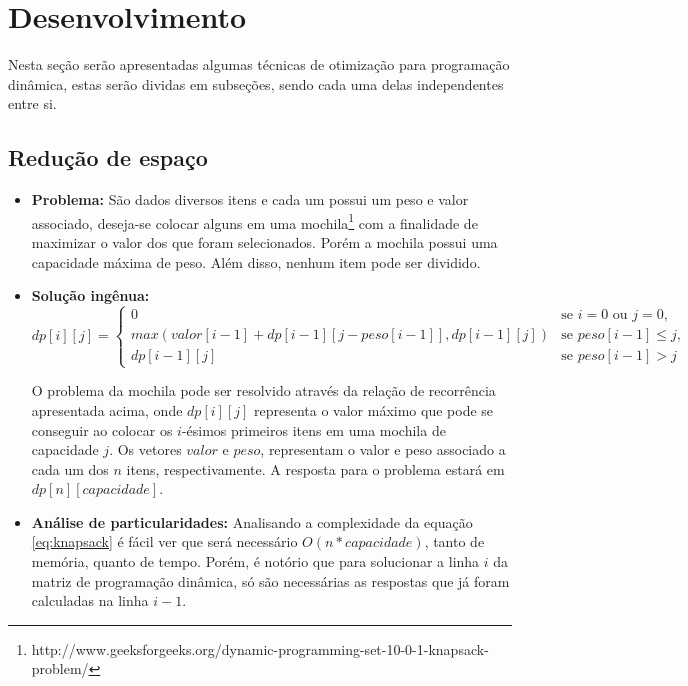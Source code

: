 \chapter{Desenvolvimento}
\label{chap:desenvolvimento}

Nesta seção serão apresentadas algumas técnicas de otimização para programação dinâmica, estas serão dividas em subseções, sendo cada uma delas independentes entre si.

\section{Redução de espaço}

\begin{itemize}
\item \textbf{Problema:}
 São dados diversos itens e cada um possui um peso e valor associado, deseja-se colocar alguns em uma mochila\footnote{http://www.geeksforgeeks.org/dynamic-programming-set-10-0-1-knapsack-problem/} com a finalidade de maximizar o valor dos que foram selecionados. Porém a mochila possui uma capacidade máxima de peso. Além disso, nenhum item pode ser dividido.
 \\
\item \textbf{Solução ingênua:} 
\begin{equation}
dp[i][j] = 
\begin{cases}
0 &\text{se } i = 0 \text{ ou } j = 0,\\
max(valor[i-1] + dp[i-1][j-peso[i-1]], dp[i-1][j]) &\text{se } peso[i-1] \leq{j},\\
dp[i-1][j] &\text{se } peso[i-1] > j
\end{cases}
\label{eq:knapsack}
\end{equation}

O problema da mochila pode ser resolvido através da relação de recorrência apresentada acima, onde $dp[i][j]$ representa o valor máximo que pode se conseguir ao colocar os $i$-ésimos primeiros itens em uma mochila de capacidade $j$. Os vetores $valor$ e $peso$, representam o valor e peso associado a cada um dos $n$ itens, respectivamente. A resposta para o problema estará em $dp[n][capacidade]$.


\item \textbf{Análise de particularidades:}
Analisando a complexidade da equação \ref{eq:knapsack} é fácil ver que será necessário $O(n*capacidade)$, tanto de memória, quanto de tempo. Porém, é notório que para solucionar a linha $i$ da matriz de programação dinâmica, só são necessárias as respostas que já foram calculadas na linha $i - 1$.



\end{itemize}
